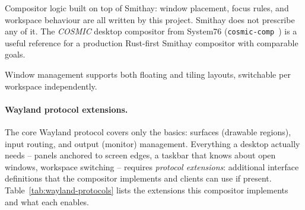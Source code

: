 Compositor logic built on top of Smithay: window placement, focus rules, and
workspace behaviour are all written by this project. Smithay does not prescribe
any of it. The \emph{COSMIC} desktop compositor from System76
(\texttt{cosmic-comp}~\cite{cosmic:comp}) is a useful reference for a
production Rust-first Smithay compositor with comparable goals.

Window management supports both floating and tiling layouts, switchable per
workspace independently.

\paragraph{Wayland protocol extensions.}
The core Wayland protocol covers only the basics: surfaces (drawable regions),
input routing, and output (monitor) management. Everything a desktop actually
needs -- panels anchored to screen edges, a taskbar that knows about open
windows, workspace switching -- requires \emph{protocol extensions}: additional
interface definitions that the compositor implements and clients can use if
present. Table~\ref{tab:wayland-protocols} lists the extensions this compositor
implements and what each enables.

